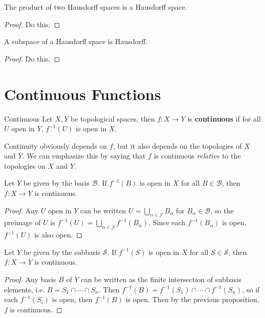 \documentclass[10pt]{report}
\begin{document}
\begin{prop}
	The product of two Hausdorff spaces is a Hausdorff space.
\end{prop}
\begin{proof}
	{\color{red}Do this.}
\end{proof}

\begin{prop}
	A subspace of a Hausdorff space is Hausdorff.
\end{prop}
\begin{proof}
	{\color{red}Do this.}
\end{proof}



\section{Continuous Functions}

\begin{defn}{Continuous}{}
	Let $X,Y$ be topological spaces, then $f : X \to Y$ is \textbf{continuous} if for all $U$ open in $Y$, $f^{-1}(U)$ is open in $X$.
\end{defn}

Continuity obviously depends on $f$, but it also depends on the topologies of $X$ and $Y$. We can emphasize this by saying that $f$ is continuous \textit{relative} to the topologies on  $X$ and $Y$.

\begin{prop}
	Let $Y$ be given by the basis $\mathcal{B}$. If $f^{-1}(B)$ is open in $X$ for all $B \in \mathcal{B}$, then $f: X \to Y$ is continuous.
\end{prop}
\begin{proof}
	Any $U$ open in $Y$ can be written $U = \bigcup_{\alpha\in\mathcal{J}} B_\alpha$ for $B_\alpha \in \mathcal{B}$, so the preimage of $U$ is $f^{-1}(U) = \bigcup_{\alpha\in\mathcal{J}} f^{-1}(B_\alpha)$. Since each $f^{-1}(B_\alpha)$ is open, $f^{-1}(U)$ is also open.
\end{proof}

\begin{prop}
	Let $Y$ be given by the subbasis $\mathcal{S}$. If $f^{-1}(S)$ is open in $X$ for all $S \in \mathcal{S}$, then $f: X \to Y$ is continuous.
\end{prop}
\begin{proof}
	Any basis $B$ of $Y$ can be written as the finite intersection of subbasis elements, i.e. $B = S_1 \cap \cdots \cap S_n$. Then $f^{-1}(B) = f^{-1}(S_1) \cap \cdots \cap f^{-1}(S_n)$, so if each $f^{-1}(S_i)$ is open, then $f^{-1}(B)$ is open. Then by the previous proposition, $f$ is continuous.
\end{proof}
\end{document}
